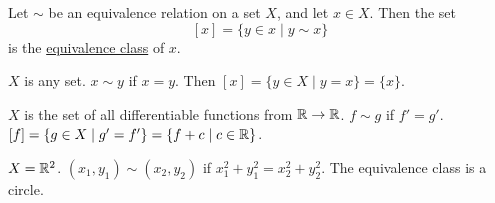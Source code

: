 \documentclass[]{article}
\begin{document}
\newpage

\begin{definition}
	Let $\sim$ be an equivalence relation on a set $X$, and let $x\in X$. Then the set $$[x] = \{y\in x \mid y\sim x\}$$ is the \ul{equivalence class} of $x$.
\end{definition}
\begin{example}
	$X$ is any set. $x\sim y$ if $x=y$. Then $[x] = \{y\in X\mid y=x\} = \{x\}$.
\end{example}
\begin{example}
	$X$ is the set of all differentiable functions from $\mathbb{R}\rightarrow\mathbb{R}$. $f\sim g$ if $f' = g'$. $[f] = \{g\in X\mid g' = f'\} = \{f + c\mid c\in\mathbb{R}\}$.
\end{example}
\begin{example}
	$X = \mathbb{R}^2$. $(x_1,y_1)\sim (x_2,y_2)$ if $x_1^2 + y_1^2 = x_2^2 + y_2^2$. The equivalence class is a circle.
\end{example}
\end{document}
